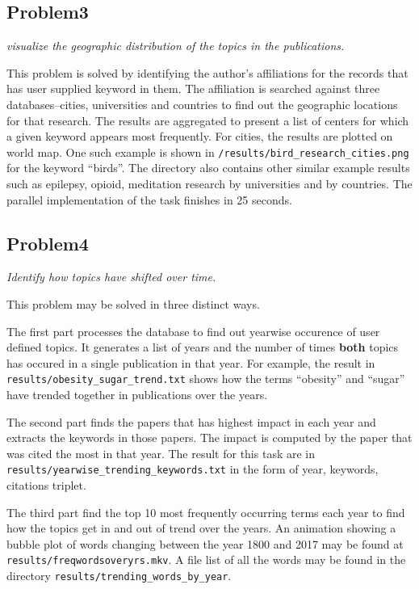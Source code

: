 \documentclass{article}
\begin{document}
\subsection*{Problem3}
\textit{visualize the geographic distribution of the topics in the publications.}

This problem is solved by identifying the author's affiliations for the records
that has user supplied keyword in them. The affiliation is searched against
three databases--cities, universities and countries to find out the geographic
locations for that research. The results are aggregated to present a list of
centers for which a given keyword appears most frequently. For cities, the
results are plotted on world map. One such example is shown in
\texttt{/results/bird\_research\_cities.png} for the keyword ``birds''. The
directory also contains other similar example results such as epilepsy, opioid,
meditation research by universities and by countries. The parallel
implementation of the task finishes in 25 seconds.

\subsection*{Problem4}
\textit{Identify how topics have shifted over time.}

This problem may be solved in three distinct ways.

The first part processes the database to find out yearwise occurence of user
defined topics. It generates a list of years and the number of times
\textbf{both} topics has occured in a single publication in that year. For
example, the result in \texttt{results/obesity\_sugar\_trend.txt} shows how the
terms ``obesity'' and ``sugar'' have trended together in publications over the
years.

The second part finds the papers that has highest impact in each year and
extracts the keywords in those papers. The impact is computed by the paper that
was cited the most in that year. The result for this task are in
\texttt{results/yearwise\_trending\_keywords.txt} in the form of year,
keywords, citations triplet.

The third part find the top 10 most frequently occurring terms each year to
find how the topics get in and out of trend over the years. An animation
showing a bubble plot of words changing between the year 1800 and 2017 may be
found at \texttt{results/freqwordsoveryrs.mkv}. A file list of all the words
may be found in the directory \texttt{results/trending\_words\_by\_year}.
\end{document}
